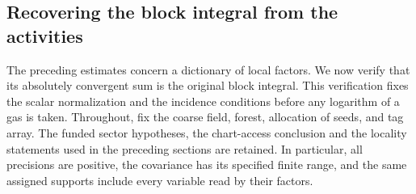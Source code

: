 \subsection{Recovering the block integral from the activities}
\label{sec:gaussian-reassembly}
The preceding estimates concern a dictionary of local factors. We now
verify that its absolutely convergent sum is the original block integral.
This verification fixes the scalar normalization and the incidence conditions
before any logarithm of a gas is taken. Throughout, fix the coarse field,
forest, allocation of seeds, and tag array. The funded sector hypotheses,
the chart-access conclusion and the locality statements used in the preceding
sections are retained. In particular, all precisions are positive, the
covariance has its specified finite range, and the same assigned supports
include every variable read by their factors.

